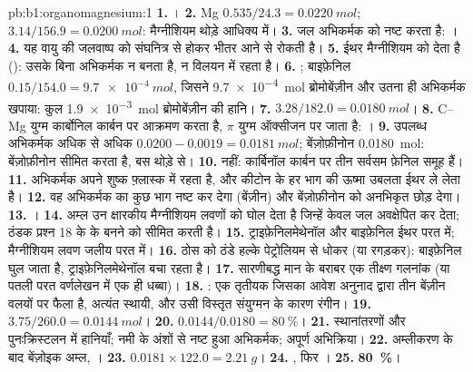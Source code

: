 \begin{solution}{pb:b1:organomagnesium:1}
\textbf{1.} ।
\textbf{2.} Mg $0.535/24.3 = \qty{0.0220}{mol}$;  $3.14/156.9 =
\qty{0.0200}{mol}$: मैग्नीशियम थोड़े आधिक्य में।
\textbf{3.} जल अभिकर्मक को नष्ट करता है: ।
\textbf{4.} यह वायु की जलवाष्प को संघनित्र से होकर भीतर आने से
रोकती है।
\textbf{5.} ईथर मैग्नीशियम को  देता है ():
उसके बिना अभिकर्मक न बनता है, न विलयन में रहता है।
\textbf{6.} ; बाइफ़ेनिल
$0.15/154.0 = \qty{9.7e-4}{mol}$, जिसने \qty{9.7e-4}{mol}
ब्रोमोबेंज़ीन और उतना ही अभिकर्मक खपाया: कुल \qty{1.9e-3}{mol} ब्रोमोबेंज़ीन
की हानि।
\textbf{7.} $3.28/182.0 = \qty{0.0180}{mol}$।
\textbf{8.} C--Mg युग्म कार्बोनिल कार्बन पर आक्रमण करता है, $\pi$ युग्म
ऑक्सीजन पर जाता है:  ।
\textbf{9.} उपलब्ध अभिकर्मक अधिक से अधिक $0.0200 - 0.0019 = \qty{0.0181}{mol}$;
बेंज़ोफ़ीनोन \qty{0.0180}{mol}: बेंज़ोफ़ीनोन सीमित करता है, बस थोड़े से।
\textbf{10.} नहीं: कार्बिनॉल कार्बन पर तीन सर्वसम फ़ेनिल समूह हैं।
\textbf{11.} अभिकर्मक अपने शुष्क फ़्लास्क में रहता है, और कीटोन के हर भाग की
ऊष्मा उबलता ईथर ले लेता है।
\textbf{12.} वह अभिकर्मक का कुछ भाग नष्ट कर देगा (बेंज़ीन) और
बेंज़ोफ़ीनोन को अनभिकृत छोड़ देगा।
\textbf{13.} ।
\textbf{14.} अम्ल उन क्षारकीय मैग्नीशियम लवणों को घोल देता है जिन्हें केवल जल
अवक्षेपित कर देता; ठंडक प्रश्न 18 के
 के बनने को सीमित करती है।
\textbf{15.} ट्राइफ़ेनिलमेथेनॉल और बाइफ़ेनिल ईथर परत में;
मैग्नीशियम लवण जलीय परत में।
\textbf{16.} ठोस को ठंडे हल्के पेट्रोलियम से धोकर (या रगड़कर):
बाइफ़ेनिल घुल जाता है, ट्राइफ़ेनिलमेथेनॉल बचा रहता है।
\textbf{17.} सारणीबद्ध मान के बराबर एक तीक्ष्ण गलनांक (या पतली परत वर्णलेखन में
एक ही धब्बा)।
\textbf{18.} : एक तृतीयक 
जिसका आवेश अनुनाद द्वारा तीन बेंज़ीन वलयों पर फैला है, अत्यंत
स्थायी, और उसी विस्तृत संयुग्मन के कारण रंगीन।
\textbf{19.} $3.75/260.0 = \qty{0.0144}{mol}$।
\textbf{20.} $0.0144/0.0180 = \qty{80}{\percent}$।
\textbf{21.} स्थानांतरणों और पुनःक्रिस्टलन में हानियाँ; नमी के अंशों से नष्ट हुआ
अभिकर्मक; अपूर्ण अभिक्रिया।
\textbf{22.} अम्लीकरण के बाद बेंज़ोइक अम्ल, ।
\textbf{23.} $0.0181 \times 122.0 = \qty{2.21}{g}$।
\textbf{24.} , फिर
।
\textbf{25.} \textbf{\qty{80}{\percent}}।
\end{solution}
